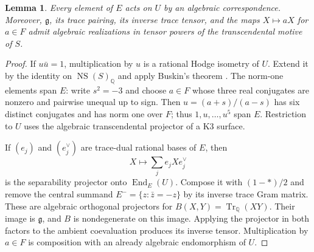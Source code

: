 \documentclass[11pt]{article}
\newtheorem{lemma}[theorem]{Lemma}
\theoremstyle{definition}
\theoremstyle{remark}
\begin{document}
\begin{lemma}\label{clifford-lem:field-projectors}
Every element of $E$ acts on $U$ by an algebraic correspondence.  Moreover,
$\mathfrak g$, its trace pairing, its inverse trace tensor, and the maps
$X\mapsto aX$ for $a\in F$ admit algebraic realizations in tensor powers
of the transcendental motive of $S$.
\end{lemma}
\begin{proof}
If $u\bar u=1$, multiplication by $u$ is a rational Hodge isometry of
$U$.  Extend it by the identity on $\operatorname{NS}(S)_{\mathbb Q}$ and
apply Buskin's theorem \cite[Theorem~1.1]{clifford-Buskin}.  The norm-one
elements span $E$: write $s^2=-3$ and choose $a\in F$ whose three real
conjugates are nonzero and pairwise unequal up to sign.  Then
$u=(a+s)/(a-s)$ has six distinct conjugates and has norm one over $F$;
thus $1,u,\ldots,u^5$ span $E$.  Restriction to $U$ uses the algebraic
transcendental projector of a K3 surface.

If $(e_j)$ and $(e_j^\vee)$ are trace-dual rational bases of $E$, then
\[
 X\longmapsto\sum_j e_jXe_j^\vee
\]
is the separability projector onto $\operatorname{End}_E(U)$.
Compose it with $(1-*)/2$ and remove the central summand
$E^-=\{z:\bar z=-z\}$ by its inverse trace Gram matrix.
These are algebraic orthogonal projectors for
$B(X,Y)=\operatorname{Tr}_{\mathbb Q}(XY)$.  Their image is
$\mathfrak g$, and $B$ is nondegenerate on this image.  Applying the
projector in both factors to the ambient coevaluation produces its inverse
tensor.  Multiplication by $a\in F$ is composition with an already
algebraic endomorphism of $U$.
\end{proof}
\end{document}
